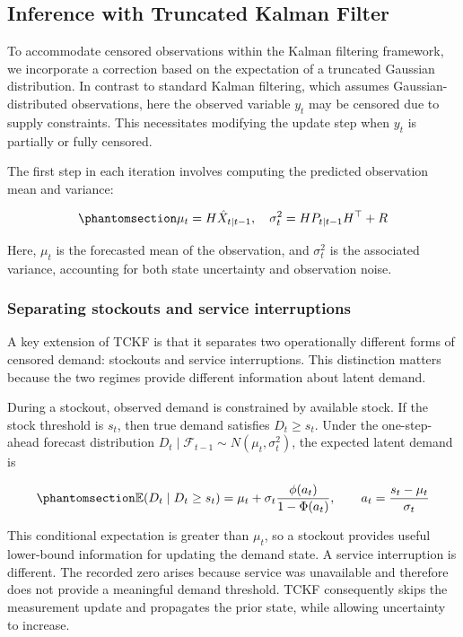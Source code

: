 \documentclass[
  11pt,
  authoryear,
  doubleblind,
  3p]{elsarticle}
\begin{document}
\subsection{Inference with Truncated Kalman
Filter}\label{inference-with-truncated-kalman-filter}

To accommodate censored observations within the Kalman filtering
framework, we incorporate a correction based on the expectation of a
truncated Gaussian distribution. In contrast to standard Kalman
filtering, which assumes Gaussian-distributed observations, here the
observed variable \(y_t\) may be censored due to supply constraints.
This necessitates modifying the update step when \(y_t\) is partially or
fully censored.

The first step in each iteration involves computing the predicted
observation mean and variance:

\begin{equation}\phantomsection\label{eq-six}{
\mu_t = H \hat{X}_{t|t-1}, \quad \sigma^2_t = H P_{t|t-1} H^\top + R
}\end{equation}

Here, \(\mu_t\) is the forecasted mean of the observation, and
\(\sigma^2_t\) is the associated variance, accounting for both state
uncertainty and observation noise.

\subsubsection{Separating stockouts and service
interruptions}\label{sec-model_seperate}

A key extension of TCKF is that it separates two operationally different
forms of censored demand: stockouts and service interruptions. This
distinction matters because the two regimes provide different
information about latent demand.

During a stockout, observed demand is constrained by available stock. If
the stock threshold is \(s_t\), then true demand satisfies
\(D_t \geq s_t\). Under the one-step-ahead forecast distribution
\(D_t \mid \mathcal{F}_{t-1} \sim N(\mu_t,\sigma_t^2)\), the expected
latent demand is

\begin{equation}\phantomsection\label{eq-stockout-conditional-mean}{
\mathbb{E}(D_t \mid D_t \geq s_t)
=
\mu_t+
\sigma_t
\frac{\phi(a_t)}
{1-\Phi(a_t)},
\qquad
a_t=\frac{s_t-\mu_t}{\sigma_t}
}\end{equation}

This conditional expectation is greater than \(\mu_t\), so a stockout
provides useful lower-bound information for updating the demand state. A
service interruption is different. The recorded zero arises because
service was unavailable and therefore does not provide a meaningful
demand threshold. TCKF consequently skips the measurement update and
propagates the prior state, while allowing uncertainty to increase.
\end{document}
